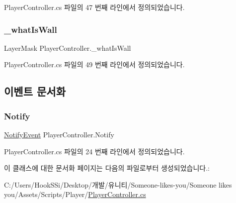 Player\+Controller.\+cs 파일의 47 번째 라인에서 정의되었습니다.

\mbox{\label{class_player_controller_a00e0ccedea38a9796587bcfc765d193e}} 
\subsubsection{\texorpdfstring{\_whatIsWall}{\_whatIsWall}}
{\footnotesize\ttfamily Layer\+Mask Player\+Controller.\+\_\+what\+Is\+Wall\hspace{0.3cm}{\ttfamily [private]}}



Player\+Controller.\+cs 파일의 49 번째 라인에서 정의되었습니다.



\subsection{이벤트 문서화}
\mbox{\label{class_player_controller_af13292e01756741118500035511fc88d}} 
\subsubsection{\texorpdfstring{Notify}{Notify}}
{\footnotesize\ttfamily \mbox{\hyperlink{class_player_controller_a934c7f80b80276620cd60eaaeea7520e}{Notify\+Event}} Player\+Controller.\+Notify\hspace{0.3cm}{\ttfamily [static]}}



Player\+Controller.\+cs 파일의 24 번째 라인에서 정의되었습니다.



이 클래스에 대한 문서화 페이지는 다음의 파일로부터 생성되었습니다.\+:\begin{DoxyCompactItemize}
\item 
C\+:/\+Users/\+Hook\+S\+Si/\+Desktop/개발/유니티/\+Someone-\/likes-\/you/\+Someone likes you/\+Assets/\+Scripts/\+Player/\mbox{\hyperlink{_player_controller_8cs}{Player\+Controller.\+cs}}\end{DoxyCompactItemize}
